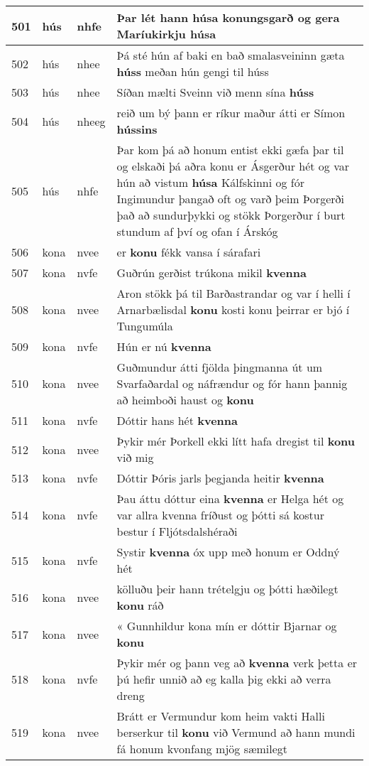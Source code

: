 \documentclass{article}
\begin{document}
\begin{longtable}{p{1cm}|p{1cm}|p{1cm}|p{13cm}}
\hline
501&hús&nhfe&Þar lét hann húsa konungsgarð og gera Maríukirkju \textbf{húsa} \\
\hline
502&hús&nhee&Þá sté hún af baki en bað smalasveininn gæta \textbf{húss} meðan hún gengi til húss\\
\hline
503&hús&nhee&Síðan mælti Sveinn við menn sína \textbf{húss} \\
\hline
504&hús&nheeg&reið um bý þann er ríkur maður átti er Símon \textbf{hússins} \\
\hline
505&hús&nhfe&Þar kom þá að honum entist ekki gæfa þar til og elskaði þá aðra konu er Ásgerður hét og var hún að vistum \textbf{húsa} Kálfskinni og fór Ingimundur þangað oft og varð þeim Þorgerði það að sundurþykki og stökk Þorgerður í burt stundum af því og ofan í Árskóg\\
\hline
506&kona&nvee&er \textbf{konu} fékk vansa í sárafari\\
\hline
507&kona&nvfe&Guðrún gerðist trúkona mikil \textbf{kvenna} \\
\hline
508&kona&nvee&Aron stökk þá til Barðastrandar og var í helli í Arnarbælisdal \textbf{konu} kosti konu þeirrar er bjó í Tungumúla\\
\hline
509&kona&nvfe&Hún er nú \textbf{kvenna} \\
\hline
510&kona&nvee&Guðmundur átti fjölda þingmanna út um Svarfaðardal og náfrændur og fór hann þannig að heimboði haust og \textbf{konu} \\
\hline
511&kona&nvfe&Dóttir hans hét \textbf{kvenna} \\
\hline
512&kona&nvee&Þykir mér Þorkell ekki lítt hafa dregist til \textbf{konu} við mig\\
\hline
513&kona&nvfe&Dóttir Þóris jarls þegjanda heitir \textbf{kvenna} \\
\hline
514&kona&nvfe&Þau áttu dóttur eina \textbf{kvenna} er Helga hét og var allra kvenna fríðust og þótti sá kostur bestur í Fljótsdalshéraði\\
\hline
515&kona&nvfe&Systir \textbf{kvenna} óx upp með honum er Oddný hét\\
\hline
516&kona&nvee&kölluðu þeir hann trételgju og þótti hæðilegt \textbf{konu} ráð\\
\hline
517&kona&nvee&« Gunnhildur kona mín er dóttir Bjarnar og \textbf{konu} \\
\hline
518&kona&nvfe&Þykir mér og þann veg að \textbf{kvenna} verk þetta er þú hefir unnið að eg kalla þig ekki að verra dreng\\
\hline
519&kona&nvee&Brátt er Vermundur kom heim vakti Halli berserkur til \textbf{konu} við Vermund að hann mundi fá honum kvonfang mjög sæmilegt\\

\end{longtable}
\end{document}
